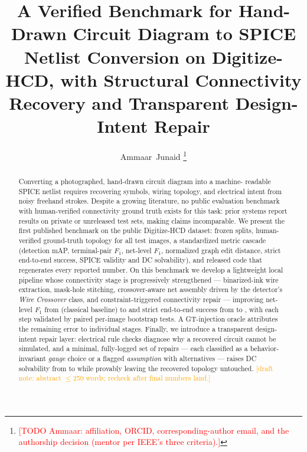 \documentclass{ieeeaccess}%
\newcommand{\todoa}[1]{\textcolor{red}{[TODO Ammaar: #1]}}
\newcommand{\draftnote}[1]{\textcolor{orange}{[draft note: #1]}}
\begin{document}
\title{A Verified Benchmark for Hand-Drawn Circuit Diagram to SPICE
Netlist Conversion on Digitize-HCD, with Structural Connectivity
Recovery and Transparent Design-Intent Repair}

\author{Ammaar~Junaid%
\thanks{\todoa{affiliation, ORCID, corresponding-author email, and the
authorship decision (mentor per IEEE's three criteria).}}%
}



\maketitle

\begin{abstract}
Converting a photographed, hand-drawn circuit diagram into a machine-
readable SPICE netlist requires recovering symbols, wiring topology, and
electrical intent from noisy freehand strokes. Despite a growing
literature, no public evaluation benchmark with human-verified
connectivity ground truth exists for this task: prior systems report
results on private or unreleased test sets, making claims incomparable.
We present the first published benchmark on the public Digitize-HCD
dataset: frozen splits, human-verified ground-truth topology for all
\NumTestImages{} test images, a standardized metric cascade (detection
mAP, terminal-pair $F_1$, net-level $F_1$, normalized graph edit
distance, strict end-to-end success, SPICE validity and DC solvability),
and released code that regenerates every reported number. On this
benchmark we develop a lightweight local pipeline whose connectivity
stage is progressively strengthened — binarized-ink wire extraction,
mask-hole stitching, crossover-aware net assembly driven by the
detector's \emph{Wire Crossover} class, and constraint-triggered
connectivity repair — improving net-level $F_1$ from
\AblNetFOneClassical{} (classical baseline) to \AblNetFOneFinal{} and
strict end-to-end success from \AblStrictClassical{} to
\AblStrictFinal{}, with each step validated by paired per-image
bootstrap tests. A
GT-injection oracle attributes the remaining error to individual
stages. Finally, we introduce a transparent design-intent repair layer:
electrical rule checks diagnose why a recovered circuit cannot be
simulated, and a minimal, fully-logged set of repairs — each classified
as a behavior-invariant \emph{gauge} choice or a flagged
\emph{assumption} with alternatives — raises DC solvability from
\RepSolvBefore{} to \RepSolvAfter{} while provably leaving the
recovered topology untouched. \draftnote{abstract $\le$250 words;
recheck after final numbers land.}
\end{abstract}
\end{document}
